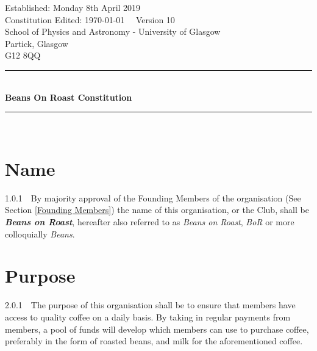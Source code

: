 \documentclass[a4paper,11pt]{article}
\begin{document}
\begin{titlepage} %
\begin{center} %

Established: Monday 8th April 2019\\
Constitution Edited: \today $\quad$ Version 10\\[1cm]

School of Physics and Astronomy - University of Glasgow\\
Partick, Glasgow\\
G12 8QQ\\[4mm] %
\rule[0.4cm]{15cm}{.2pt}\\ %
{\Huge \textbf{Beans On Roast Constitution}}
\rule[0.4cm]{15cm}{.2pt}\\ %
\end{center}

\centering
{}

\tableofcontents

\end{titlepage}



\section{Name}
\label{Name}
1.0.1$\quad$By majority approval of the Founding Members of the organisation (See Section \ref{Founding Members}) the name of this organisation, or the Club, shall be \textit{\textbf{Beans on Roast}}, hereafter also referred to as \textit{Beans on Roast}, \textit{BoR} or more colloquially \textit{Beans}.
\section{Purpose}
\label{Purpose}
2.0.1$\quad$The purpose of this organisation shall be to ensure that members have access to quality coffee on a daily basis. By taking in regular payments from members, a pool of funds will develop which members can use to purchase coffee, preferably in the form of roasted beans, and milk for the aforementioned coffee. \\
\end{document}
